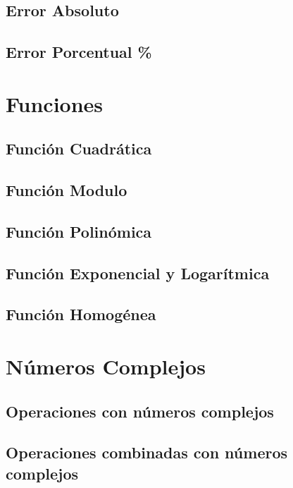 \documentclass{article}
\begin{document}
	\subsection{Error Absoluto}
	
	\subsection{Error Porcentual \% }
	
	
	\section{Funciones}
	\subsection{Función Cuadrática}
	
	
	\subsection{Función Modulo}
	
	
	\subsection{Función Polinómica}
	
	
	\subsection{Función Exponencial y Logarítmica}
	
	
	\subsection{Función Homogénea}
	
	
	\section{Números Complejos}
	
	\subsection{Operaciones con números complejos}
	
	\subsection{Operaciones combinadas con números complejos}
	
	
	
	\begin{theo}
		
	\end{theo}
\end{document}
